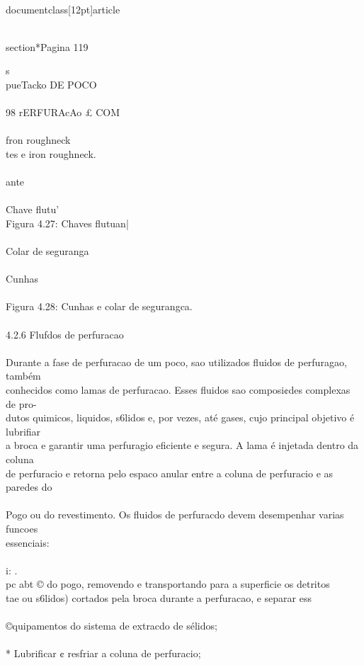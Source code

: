 \\documentclass[12pt]{article}
\begin{document}
\\section*{Pagina 119}

s\\
pueTacko DE POCO\\
\\
98 rERFURAcAo £ COM\\
\\
fron roughneck\\
tes e iron roughneck.\\
\\
ante\\
\\
Chave flutu'\\
Figura 4.27: Chaves flutuan|\\
\\
Colar de seguranga\\
\\
Cunhas\\
\\
Figura 4.28: Cunhas e colar de segurangca.\\
\\
4.2.6 Flufdos de perfuracao\\
\\
Durante a fase de perfuracao de um poco, sao utilizados fluidos de perfuragao, também\\
conhecidos como lamas de perfuracao. Esses fluidos sao composi¢des complexas de pro-\\
dutos quimicos, liquidos, s6lidos e, por vezes, até gases, cujo principal objetivo é lubrifiar\\
a broca e garantir uma perfuragio eficiente e segura. A lama é injetada dentro da coluna\\
de perfuracio e retorna pelo espaco anular entre a coluna de perfuracio e as paredes do\\
\\
Pogo ou do revestimento. Os fluidos de perfuracdo devem desempenhar varias funcoes\\
essenciais:\\
\\
i: .\\
pc abt © do pogo, removendo e transportando para a superficie os detritos\\
tae ou s6lidos) cortados pela broca durante a perfuracao, e separar ess\\
\\
©quipamentos do sistema de extracdo de sélidos;\\
\\
* Lubrificar ¢ resfriar a coluna de perfuracio;\\
\end{document}
